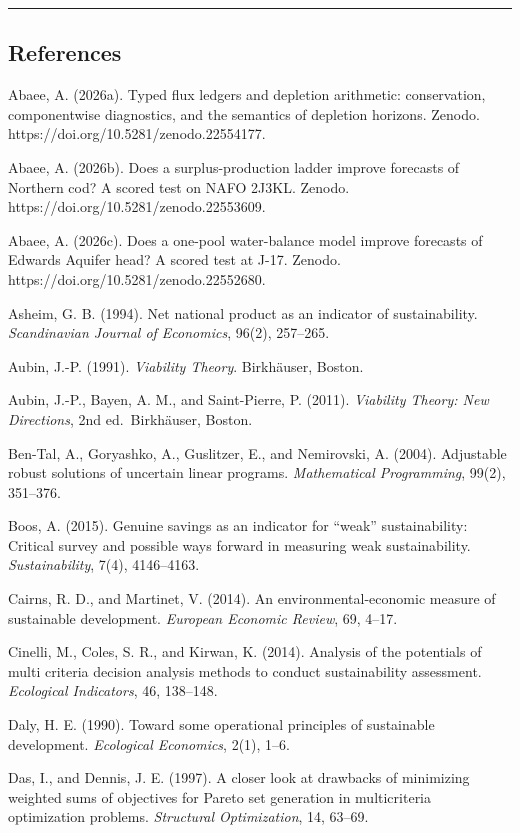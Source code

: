 \documentclass[11pt]{article}
\begin{document}
\begin{center}\rule{0.5\linewidth}{0.5pt}\end{center}

\subsection{References}\label{references}

Abaee, A. (2026a). Typed flux ledgers and depletion arithmetic: conservation, componentwise diagnostics, and the semantics of depletion horizons. Zenodo. https://doi.org/10.5281/zenodo.22554177.

Abaee, A. (2026b). Does a surplus-production ladder improve forecasts of Northern cod? A scored test on NAFO 2J3KL. Zenodo. https://doi.org/10.5281/zenodo.22553609.

Abaee, A. (2026c). Does a one-pool water-balance model improve forecasts of Edwards Aquifer head? A scored test at J-17. Zenodo. https://doi.org/10.5281/zenodo.22552680.

Asheim, G. B. (1994). Net national product as an indicator of sustainability. \emph{Scandinavian Journal of Economics}, 96(2), 257--265.

Aubin, J.-P. (1991). \emph{Viability Theory}. Birkh\"auser, Boston.

Aubin, J.-P., Bayen, A. M., and Saint-Pierre, P. (2011). \emph{Viability Theory: New Directions}, 2nd ed.~Birkh\"auser, Boston.

Ben-Tal, A., Goryashko, A., Guslitzer, E., and Nemirovski, A. (2004).
Adjustable robust solutions of uncertain linear programs.
\emph{Mathematical Programming}, 99(2), 351--376.

Boos, A. (2015). Genuine savings as an indicator for ``weak''
sustainability: Critical survey and possible ways forward in measuring
weak sustainability. \emph{Sustainability}, 7(4), 4146--4163.

Cairns, R. D., and Martinet, V. (2014). An environmental-economic
measure of sustainable development. \emph{European Economic Review}, 69,
4--17.

Cinelli, M., Coles, S. R., and Kirwan, K. (2014). Analysis of the
potentials of multi criteria decision analysis methods to conduct
sustainability assessment. \emph{Ecological Indicators}, 46, 138--148.

Daly, H. E. (1990). Toward some operational principles of sustainable
development. \emph{Ecological Economics}, 2(1), 1--6.

Das, I., and Dennis, J. E. (1997). A closer look at drawbacks of
minimizing weighted sums of objectives for Pareto set generation in
multicriteria optimization problems. \emph{Structural Optimization}, 14,
63--69.
\end{document}
